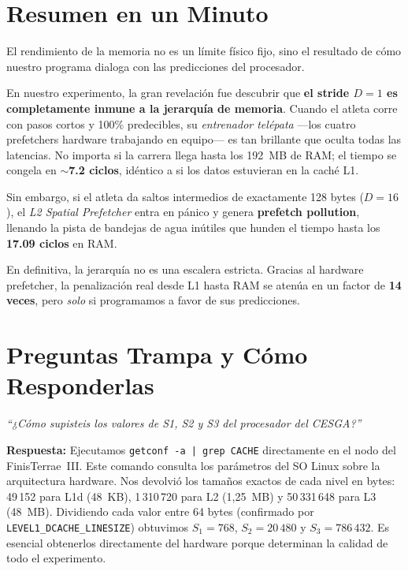 \documentclass[12pt,a4paper]{article}
\begin{document}
\section{Resumen en un Minuto}
\label{sec:resumen}

\begin{tcolorbox}[conclusion, title={La gran conclusión de la práctica}]
El rendimiento de la memoria no es un límite físico fijo, sino el resultado de cómo nuestro programa dialoga con las predicciones del procesador.

\vspace{8pt}
En nuestro experimento, la gran revelación fue descubrir que \textbf{el stride $D=1$ es completamente inmune a la jerarquía de memoria}. Cuando el atleta corre con pasos cortos y 100\% predecibles, su \emph{entrenador telépata} ---los cuatro prefetchers hardware trabajando en equipo--- es tan brillante que oculta todas las latencias. No importa si la carrera llega hasta los 192~MB de RAM; el tiempo se congela en \textbf{$\sim$7.2 ciclos}, idéntico a si los datos estuvieran en la caché L1.

\vspace{8pt}
Sin embargo, si el atleta da saltos intermedios de exactamente 128 bytes ($D=16$), el \emph{L2 Spatial Prefetcher} entra en pánico y genera \textbf{prefetch pollution}, llenando la pista de bandejas de agua inútiles que hunden el tiempo hasta los \textbf{17.09 ciclos} en RAM.

\vspace{8pt}
En definitiva, la jerarquía no es una escalera estricta. Gracias al hardware prefetcher, la penalización real desde L1 hasta RAM se atenúa en un factor de \textbf{14 veces}, pero \emph{solo} si programamos a favor de sus predicciones.
\end{tcolorbox}

\section{Preguntas Trampa y Cómo Responderlas}
\label{sec:trampa}

\begin{tcolorbox}[trampa, title={Pregunta Trampa 1 --- Valores de S1, S2 y S3}]
\textit{``¿Cómo supisteis los valores de S1, S2 y S3 del procesador del CESGA?''}

\vspace{6pt}
\textbf{Respuesta:} Ejecutamos \texttt{getconf -a | grep CACHE} directamente en el nodo del FinisTerrae~III. Este comando consulta los parámetros del SO Linux sobre la arquitectura hardware. Nos devolvió los tamaños exactos de cada nivel en bytes: 49\,152 para L1d (48~KB), 1\,310\,720 para L2 (1,25~MB) y 50\,331\,648 para L3 (48~MB). Dividiendo cada valor entre 64 bytes (confirmado por \texttt{LEVEL1\_DCACHE\_LINESIZE}) obtuvimos $S_1=768$, $S_2=20\,480$ y $S_3=786\,432$. Es esencial obtenerlos directamente del hardware porque determinan la calidad de todo el experimento.
\end{tcolorbox}
\end{document}
